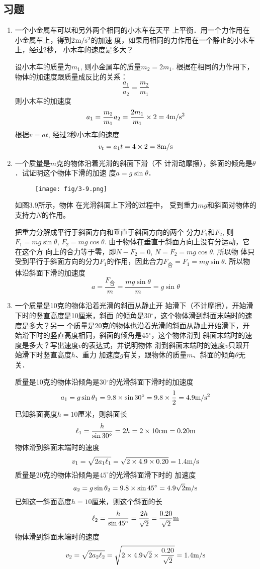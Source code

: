 \subsection{习题}
\begin{enumerate}
    \item 一个小金属车可以和另外两个相同的小木车在天平
上平衡．用一个力作用在小金属车上，得到2$\text{m}/\text{s}^2$的加速
度，如果用相同的力作用在一个静止的小木车上，经过2秒，
小木车的速度是多大？

\begin{solution}
    设小木车的质量为$m_1$, 则小金属车的质量$m_2=2m_1$.
根据在相同的力作用下，物体的加速度跟质量成反比的关系：
\[\frac{a_1}{a_2}=\frac{m_2}{m_1}\]
则小木车的加速度
\[a_1=\frac{m_2}{m_1}a_2=\frac{2m_1}{m_1}\times 2=4\text{m}/\text{s}^2\]
根据$v=at$, 经过2秒小木车的速度
\[v_t=a_1t=4\times2=8\text{m}/\text{s}\]
\end{solution}
\item  一个质量是$m$克的物体沿着光滑的斜面下滑（不
计滑动摩擦），斜面的倾角是$\theta$．试证明这个物体下滑的加速
度$a=g\sin\theta$．

\begin{figure}[htp]
    \centering
\texttt{[image: fig/3-9.png]}
    \caption{}
\end{figure}

\begin{solution}
如图3.9所示，物体
在光滑斜面上下滑的过程中，
受到重力$mg$和斜面对物体的
支持力$N$的作用。

把重力分解成平行于斜面方向和垂直于斜面方向的两个
分力$F_1$和$F_2$, 则$F_1=mg\sin\theta$, $F_2=mg\cos\theta$.
由于物体在垂直于斜面方向上没有分运动，它在这个方
向上的合力等于零，即$N-F_2=0$, $N=F_2=mg\cos\theta$. 所以物
体只受到平行于斜面方向的分力$F_1$的作用，因此合力$F_{\text{合}}=F_1=mg\sin\theta$. 所以物体沿斜面下滑的加速度
\[a=\frac{F_{\text{合}}}{m}=\frac{mg\sin\theta}{m}=g\sin\theta\]
\end{solution}
\item  一个质量是10克的物体沿着光滑的斜面从静止开
始滑下（不计摩擦），开始滑下时的竖直高度是10厘米，斜面
的倾角是30$^\circ$，这个物体滑到斜面末端时的速度是多大？另一
个质量是20克的物体也沿着光滑的斜面从静止开始滑下，开
始滑下时的竖直高度相同，斜面的倾角是45$^\circ$，这个物体滑到
斜面末端时的速度是多大？写出速度$v$的表达式，并说明物体
滑到斜面末端时的速度$v$只跟开始滑下时竖直高度$h$、重力
加速度$g$有关，跟物休的质量$m$、斜面的倾角$\theta$无关．

\begin{solution}
    质量是10克的物体沿倾角是30$^\circ$的光滑斜面下滑时的加速度
\[a_1=g\sin\theta_1=9.8\times \sin 30^\circ=9.8\times \frac{1}{2}=4.9\text{m}/\text{s}^2\]
已知斜面高度$h=10$厘米，则斜面长
\[\ell_1=\frac{h}{\sin 30^{\circ}}=2h=2\times 10{\rm cm}=0.20{\rm m}\]
物体滑到斜面末端时的速度
\[v_1=\sqrt{2a_1\ell_1}=\sqrt{2\times4.9\times0.20}=1.4\text{m}/\text{s}\]
质量是20克的物体沿倾角是$45^{\circ}$的光滑斜面滑下时的
加速度
\[a_2=g\sin\theta_2=9.8\times\sin45^{\circ}=4.9\sqrt{2}\text{m}/\text{s}\]
已知这一斜面高度$h=10$厘米，则这个斜面的长
\[\ell_2=\frac{h}{\sin 45^{\circ}}=\frac{2h}{\sqrt{2}}=\frac{0.20}{\sqrt{2}}{\rm m}\]
物体滑到斜面末端时的速度
\[v_2=\sqrt{2a_2\ell_2}=\sqrt{2\times4.9\sqrt{2}\times\frac{0.20}{\sqrt{2}}}=1.4\text{m}/\text{s}\]


\end{solution}
\end{enumerate}
